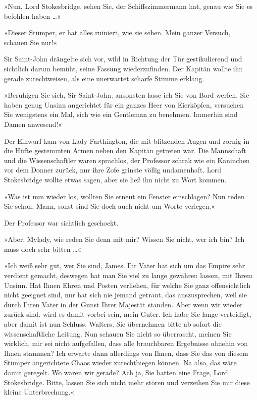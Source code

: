 »Nun, Lord Stokesbridge, sehen Sie, der Schiffszimmermann hat,
genau wie Sie es befohlen haben \ldots{}«

»Dieser Stümper, er hat alles ruiniert, wie sie sehen. Mein ganzer
Versuch, schauen Sie nur!«

Sir Saint-John drängelte sich vor, wild in Richtung der Tür
gestikulierend und sichtlich darum bemüht, seine Fassung
wiederzufinden. Der Kapitän wollte ihn gerade zurechtweisen, als
eine unerwartet scharfe Stimme erklang.

»Beruhigen Sie sich, Sir Saint-John, ansonsten lasse ich Sie von
Bord werfen. Sie haben genug Unsinn angerichtet für ein ganzes Heer
von Eierköpfen, versuchen Sie wenigstens ein Mal, sich wie ein
Gentleman zu benehmen. Immerhin sind Damen anwesend!«

Der Einwurf kam von Lady Farthington, die mit blitzenden Augen und
zornig in die Hüfte gestemmten Armen neben den Kapitän getreten
war. Die Mannschaft und die Wissenschaftler waren sprachlos, der
Professor schrak wie ein Kaninchen vor dem Donner zurück, nur ihre
Zofe grinste völlig undamenhaft. Lord Stokesbridge wollte etwas
sagen, aber sie ließ ihn nicht zu Wort kommen.

»Was ist nun wieder los, wollten Sie erneut ein Fenster
einschlagen? Nun reden Sie schon, Mann, sonst sind Sie doch auch
nicht um Worte verlegen.«

Der Professor war sichtlich geschockt.

»Aber, Mylady, wie reden Sie denn mit mir? Wissen Sie nicht, wer
ich bin? Ich muss doch sehr bitten \ldots{}«

»Ich weiß sehr gut, wer Sie sind, James. Ihr Vater hat sich um das
Empire sehr verdient gemacht, deswegen hat man Sie viel zu lange
gewähren lassen, mit Ihrem Unsinn. Hat Ihnen Ehren und Posten
verliehen, für welche Sie ganz offensichtlich nicht geeignet sind,
nur hat sich nie jemand getraut, das auszusprechen, weil sie durch
Ihren Vater in der Gunst Ihrer Majestät standen. Aber wenn wir
wieder zurück sind, wird es damit vorbei sein, mein Guter. Ich habe
Sie lange verteidigt, aber damit ist nun Schluss. Walters, Sie
übernehmen bitte ab sofort die wissenschaftliche Leitung. Nun
schauen Sie nicht so überrascht, meinen Sie wirklich, mir sei nicht
aufgefallen, dass alle brauchbaren Ergebnisse ohnehin von Ihnen
stammen? Ich erwarte dann allerdings von Ihnen, dass Sie das von
diesem Stümper angerichtete Chaos wieder zurechtbiegen können. Na
also, das wäre damit geregelt. Wo waren wir gerade? Ach ja, Sie
hatten eine Frage, Lord Stokesbridge. Bitte, lassen Sie sich nicht
mehr stören und verzeihen Sie mir diese kleine Unterbrechung.«

